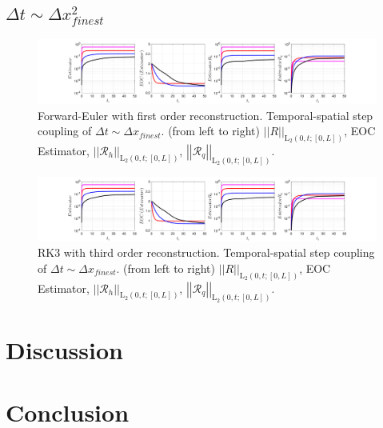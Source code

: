 \documentclass[12pt,a4paper]{article}
\numberwithin{equation}{section}
\theoremstyle{definition}
\newcommand{\leb}{\text{L}}
\newcommand{\qp}[1]{\left(#1\right)}
\newcommand{\qb}[1]{\left[#1\right]}
\newcommand{\Normgs}[1]{\left|\left|#1\right|\right|}
\begin{document}
\subsection*{$\Delta t \sim \Delta x_{finest}^2$}
\begin{figure}[H]
	\hspace{-3cm}
	\includegraphics[scale=0.55]{../figures/fig_SHW_RK1_LXF_rec1_pow_twoplots_1x5_shw_periodic}	
	\caption{Forward-Euler with first order reconstruction.  Temporal-spatial step coupling of $\Delta t\sim \Delta x_{finest}$. (from left to right) $\Normgs{R}_{\leb_2\qp{0,t; \qb{0,L}}}$, EOC Estimator, $\Normgs{\mathcal{R}_h}_{\leb_2\qp{0,t; \qb{0,L}}}$, $\Normgs{\mathcal{R}_q}_{\leb_2\qp{0,t; \qb{0,L}}}$.}
	\label{fig_all_RK1_LXF_rec1_pow_two}
\end{figure}

\begin{figure}[H]
	\hspace{-3cm}
	\includegraphics[scale=0.55]{../figures/fig_SHW_RK3_LXF_rec3_pow_twoplots_1x5_shw_periodic}	
	\caption{RK3 with third order reconstruction.  Temporal-spatial step coupling of $\Delta t\sim \Delta x_{finest}$. (from left to right) $\Normgs{R}_{\leb_2\qp{0,t; \qb{0,L}}}$, EOC Estimator, $\Normgs{\mathcal{R}_h}_{\leb_2\qp{0,t; \qb{0,L}}}$, $\Normgs{\mathcal{R}_q}_{\leb_2\qp{0,t; \qb{0,L}}}$.}
	\label{fig_all_RK3_LXF_rec3_pow_two}
\end{figure}




\section{Discussion}\label{sec:discussion}

\section{Conclusion}\label{sec:conclusion}




\end{document}
